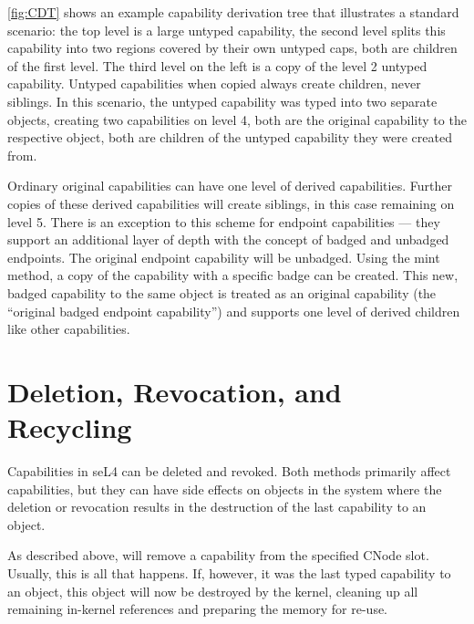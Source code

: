 \autoref{fig:CDT} shows an example capability derivation tree that
illustrates a standard scenario: the top level is a large untyped
capability, the second level splits this capability into two regions
covered by their own untyped caps, both are children of the first
level.  The third level on the left is a copy of the level 2 untyped
capability.  Untyped capabilities when copied always create children,
never siblings.  In this scenario, the untyped capability was typed
into two separate objects, creating two capabilities on level 4, both
are the original capability to the respective object, both are
children of the untyped capability they were created from.

Ordinary original capabilities can have one level of derived
capabilities.  Further copies of these derived capabilities will
create siblings, in this case remaining on level 5. There is an
exception to this scheme for endpoint capabilities --- they support an
additional layer of depth with the concept of badged and unbadged
endpoints. The original endpoint capability will be unbadged. Using
the mint method, a copy of the capability with a specific badge can be
created. This new, badged capability to the same object is treated as
an original capability (the ``original badged endpoint capability'')
and supports one level of derived children like other capabilities.


\section{Deletion, Revocation, and Recycling}
\label{s:cspace-revoke}

Capabilities in seL4 can be deleted and revoked. Both methods
primarily affect capabilities, but they can have side effects on
objects in the system where the deletion or revocation results in the
destruction of the last capability to an object.

As described above,  will
remove a capability from the specified CNode slot. Usually, this is
all that happens. If, however, it was the last typed capability to an
object, this object will now be destroyed by the kernel, cleaning up
all remaining in-kernel references and preparing the memory for
re-use.

